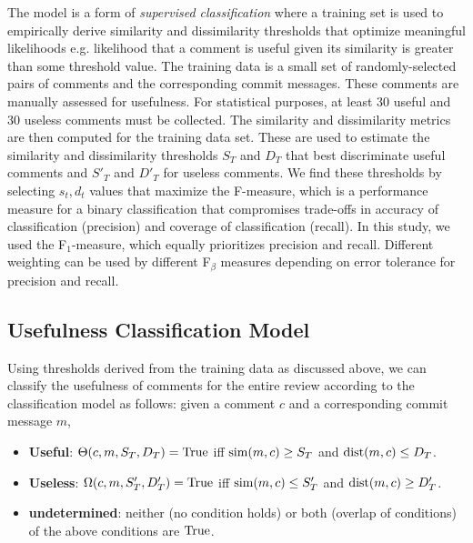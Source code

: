 The model is a form of \emph{supervised classification} 
where a training set is used to empirically derive similarity and dissimilarity thresholds that optimize meaningful likelihoods e.g. likelihood that a comment is useful given its similarity is greater than some threshold value.    
The training data is a small set of randomly-selected pairs of comments and the corresponding commit messages.
These comments are manually assessed for usefulness.
For statistical purposes, at least 30 useful and 30 useless comments must be collected.
The similarity and dissimilarity metrics are then computed for the training data set.
These are used to estimate the similarity and dissimilarity thresholds $S_T$ and $D_T$ that best discriminate useful comments and $S'_T$ and $D'_T$ for useless comments. 
We find these thresholds by selecting $s_t,d_t$ values that maximize the F-measure,
which is a performance measure for a binary classification that compromises trade-offs in accuracy of classification (precision) and coverage of classification (recall).
In this study, we used the F$_1$-measure, which equally prioritizes precision and recall.
Different weighting can be used by different F$_\beta$ measures depending on error tolerance for precision and recall.


\subsection{Usefulness Classification Model} 
Using thresholds derived from the training data as discussed above, we can classify the usefulness of comments for the entire review according to the classification model as follows: given a comment $c$ and a corresponding commit message $m$,
\begin{itemize}
\item \textbf{Useful}: $\Theta(c,m,S_T,D_T) = \operatorname{True}$ iff $\operatorname{sim}(m,c) \geq S_T$ and $\operatorname{dist}(m,c) \leq D_T$.
\item \textbf{Useless}: $\Omega(c,m,S'_T,D'_T) = \operatorname{True}$ iff $\operatorname{sim}(m,c) \leq  S'_T$ and $\operatorname{dist}(m,c) \geq D'_T$.
\item \textbf{undetermined}: neither (no condition holds) or both (overlap of conditions) of the above conditions are $\operatorname{True}$.
\end{itemize}

